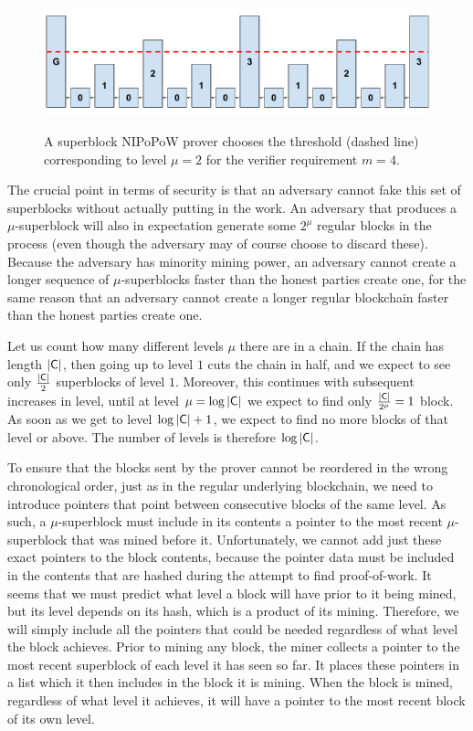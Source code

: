 \begin{figure}[ht]
    \caption{A superblock NIPoPoW prover chooses the threshold (dashed line)
    corresponding to level $\mu = 2$ for the verifier requirement $m = 4$.}
    \centering
    \includegraphics[width=0.7\columnwidth,keepaspectratio]{chapters/introduction/figures/level-threshold.pdf}
    \label{fig.level-threshold}
\end{figure}

The crucial point in terms of security is that an adversary cannot fake this
set of superblocks without actually putting in the work. An adversary that
produces a $\mu$-superblock will also in expectation generate some $2^\mu$
regular blocks in the process (even though the adversary may of course choose
to discard these). Because the adversary has minority mining power, an adversary
cannot create a longer sequence of $\mu$-superblocks faster than the honest
parties create one, for the same reason that an adversary cannot create a longer
regular blockchain faster than the honest parties create one.

Let us count how many different levels $\mu$ there are in a chain. If the chain
has length $|\mathsf{C}|$, then going up to level $1$ cuts the chain in half, and we
expect to see only $\frac{|\mathsf{C}|}{2}$ superblocks of level $1$. Moreover, this
continues with subsequent increases in level, until at level $\mu =
\log|\mathsf{C}|$ we expect to find only $\frac{|\mathsf{C}|}{2^\mu} = 1$ block. As soon
as we get to level $\log|\mathsf{C}| + 1$, we expect to find no more blocks of that
level or above. The number of levels is therefore $\log|\mathsf{C}|$.

To ensure that the blocks sent by the prover cannot be reordered in the wrong
chronological order, just as in the regular underlying blockchain, we need to
introduce pointers that point between consecutive blocks of the same level. As
such, a $\mu$-superblock must include in its contents a pointer to the most
recent $\mu$-superblock that was mined before it. Unfortunately, we cannot add
just these exact pointers to the block contents, because the pointer data must
be included in the contents that are hashed during the attempt to find
proof-of-work. It seems that we must predict what level a block will have prior
to it being mined, but its level depends on its hash, which is a product of its
mining. Therefore, we will simply include all the pointers that could be needed
regardless of what level the block achieves. Prior to mining any block, the
miner collects a pointer to the most recent superblock of each level it has seen
so far. It places these pointers in a list which it then includes in the block
it is mining. When the block is mined, regardless of what level it achieves, it
will have a pointer to the most recent block of its own level.

